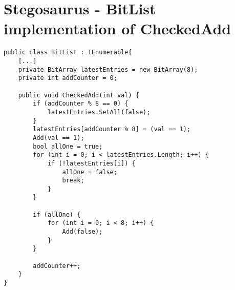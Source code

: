 \chapter{Stegosaurus - BitList implementation of CheckedAdd}
\label{app:D}
\begin{lstlisting}
public class BitList : IEnumerable{
    [...]
    private BitArray latestEntries = new BitArray(8);
    private int addCounter = 0;

    public void CheckedAdd(int val) {
        if (addCounter % 8 == 0) {
            latestEntries.SetAll(false);
        }
        latestEntries[addCounter % 8] = (val == 1);
        Add(val == 1);
        bool allOne = true;
        for (int i = 0; i < latestEntries.Length; i++) {
            if (!latestEntries[i]) {
                allOne = false;
                break;
            }
        }

        if (allOne) {
            for (int i = 0; i < 8; i++) {
                Add(false);
            }
        }
        
        addCounter++;
    }
}
\end{lstlisting}